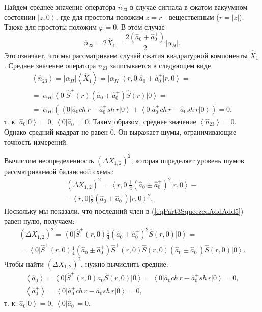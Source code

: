 Найдем среднее значение оператора $\hat{n}_{23}$ в случае сигнала в
сжатом вакуумном состоянии $\left|z, 0\right>$, где для простоты
положим $z = r$ - вещественным ($r = \left|z\right|$). Также для
простоты положим $\varphi = 0$. В этом случае 
\[
\hat{n}_{23} = 2 \hat{X}_1 = 
\frac{2\left(\hat{a}_0 + \hat{a}_0^{+}\right)}{2}\left|\alpha_H\right|.
\]
Это означает, что мы рассматриваем случай сжатия квадратурной
компоненты $\hat{X}_1$. Среднее значение оператора $\hat{n}_{23}$
записывается в следующем виде
\begin{eqnarray}
\left<\hat{n}_{23}\right> = 
\left|\alpha_H\right|\left<\hat{X}_1\right> = 
\left|\alpha_H\right|\left<r, 0\right|\hat{a}_0 +
\hat{a}_0^{+}\left|r, 0\right> =
\nonumber \\
=
\left|\alpha_H\right|\left<0\right|
\hat{S}^{+}\left(r\right)
\left(\hat{a}_0 +
\hat{a}_0^{+}\right)
\hat{S}\left(r\right)
\left|0\right> =
\nonumber \\
=
\left|\alpha_H\right|
\left(
\left<0\right|
\hat{a}_0 ch\,r -
\hat{a}_0^{+} sh\,r
\left|0\right> 
+
\left<0\right|
\hat{a}_0^{+} ch\,r -
\hat{a}_0 sh\,r
\left|0\right> 
\right)
= 0,
\nonumber
\end{eqnarray}
т. к. $\hat{a}_0\left|0\right> = 0$, 
$\left<0\right|\hat{a}_0^{+} = 0$.
Таким образом, среднее значение $\left<\hat{n}_{23}\right> =
0$. Однако средний квадрат не равен 0. Он выражает шумы, ограничивающие
точность измерений.

Вычислим неопределенность $\left(\Delta X_{1,2}\right)^2$, которая
определяет уровень шумов рассматриваемой балансной схемы:
\begin{eqnarray}
\left(\Delta X_{1,2}\right)^2 = 
\left<r,
0\right|\frac{1}{4}\left(\hat{a}_0\pm\hat{a}_0^{+}\right)^2\left|r,
0\right> -
\nonumber \\
-
\left<r,
0\right|\frac{1}{2}\left(\hat{a}_0\pm\hat{a}_0^{+}\right)\left|r,
0\right>^2.
\label{eqPart3SqueezedAddAdd5}
\end{eqnarray}
Поскольку мы показали, что последний член в
(\ref{eqPart3SqueezedAddAdd5}) равен нулю, получаем:
\begin{eqnarray}
\left(\Delta X_{1,2}\right)^2 = 
\left<0\right|\hat{S}^{+}\left(r, 0\right)
\frac{1}{4}\left(\hat{a}_0\pm\hat{a}_0^{+}\right)^2
\hat{S}\left(r, 0\right)
\left|0\right> = 
\nonumber \\
=
\left<0\right|\hat{S}^{+}\left(r, 0\right)
\frac{1}{4}
\left(\hat{a}_0\pm\hat{a}_0^{+}\right)
\hat{S}^{+}\left(r, 0\right)
\hat{S}\left(r, 0\right)
\left(\hat{a}_0\pm\hat{a}_0^{+}\right)
\hat{S}\left(r, 0\right)
\left|0\right>.
\label{eqPart3SqueezedAddAdd6}
\end{eqnarray}
Чтобы найти 
$\left(\Delta X_{1,2}\right)^2$, нужно вычислить средние:
\begin{eqnarray}
\left<\hat{a}_0\right> = 
\left<0\right|
\hat{S}^{+}\left(r, 0\right)
\hat{a}_0
\hat{S}\left(r, 0\right)
\left|0\right> = 
\left<0\right|
\hat{a}_0 ch\,r - \hat{a}_0^{+} sh\,r
\left|0\right> = 0,
\nonumber \\
\left<\hat{a}_0^{+}\right> = 
\left<0\right|
\hat{a}_0^{+} ch\,r - \hat{a}_0 sh\,r
\left|0\right> = 0,
\label{eqPart3SqueezedAddAdd7}
\end{eqnarray}
т. к. $\hat{a}_0\left|0\right> = 0$, 
$\left<0\right|\hat{a}_0^{+} = 0$.

